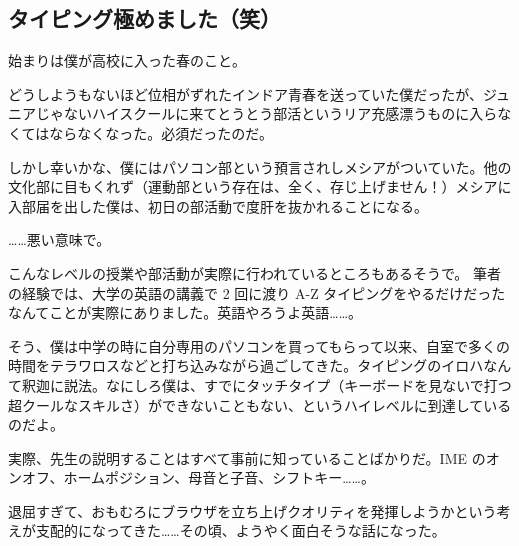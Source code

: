 \subsection{タイピング極めました（笑）}

始まりは僕が高校に入った春のこと。

どうしようもないほど位相がずれたインドア青春を送っていた僕だったが、ジュニアじゃないハイスクールに来てとうとう部活というリア充感漂うものに入らなくてはならなくなった。必須だったのだ。

しかし幸いかな、僕にはパソコン部という預言されしメシアがついていた。他の文化部に目もくれず（運動部という存在は、全く、存じ上げません！）メシアに入部届を出した僕は、初日の部活動で度肝を抜かれることになる。

……悪い意味で。







\begin{screen}
こんなレベルの授業や部活動が実際に行われているところもあるそうで。
筆者の経験では、大学の英語の講義で 2 回に渡り A-Z タイピングをやるだけだったなんてことが実際にありました。英語やろうよ英語……。
\end{screen}

そう、僕は中学の時に自分専用のパソコンを買ってもらって以来、自室で多くの時間をテラワロスなどと打ち込みながら過ごしてきた。タイピングのイロハなんて釈迦に説法。なにしろ僕は、すでにタッチタイプ（キーボードを見ないで打つ超クールなスキルさ）ができないこともない、というハイレベルに到達しているのだよ。

実際、先生の説明することはすべて事前に知っていることばかりだ。IME のオンオフ、ホームポジション、母音と子音、シフトキー……。

退屈すぎて、おもむろにブラウザを立ち上げクオリティを発揮しようかという考えが支配的になってきた……その頃、ようやく面白そうな話になった。

